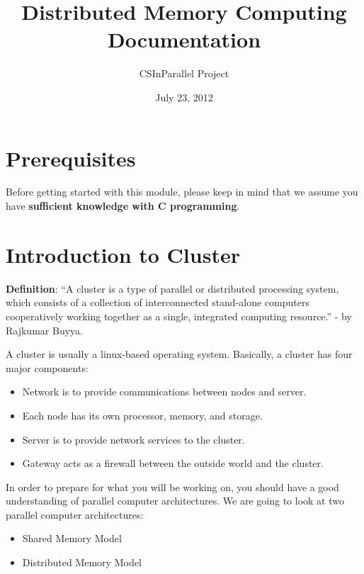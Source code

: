 \documentclass[letterpaper,10pt,openany,oneside]{sphinxmanual}
\title{Distributed Memory Computing Documentation}
\date{July 23, 2012}
\author{CSInParallel Project}
\begin{document}
\maketitle
\tableofcontents
{}\label{index::doc}



\chapter{Prerequisites}
\label{Prerequisites/Prerequisites:prerequisites}\label{Prerequisites/Prerequisites::doc}\label{Prerequisites/Prerequisites:distributed-memory-programming}
Before getting started with this module, please keep in mind that we assume you have \textbf{sufficient knowledge with C programming}.


\chapter{Introduction to Cluster}
\label{IntroCluster/IntroCluster:introduction-to-cluster}\label{IntroCluster/IntroCluster::doc}
\textbf{Definition}: ``A cluster is a type of parallel or distributed processing system, which consists of a collection of interconnected stand-alone computers cooperatively working together as a single, integrated computing resource.'' - by Rajkumar Buyya.

A cluster is usually a linux-based operating system. Basically, a cluster has four major components:
\begin{itemize}
\item {} 
Network is to provide communications between nodes and server.

\item {} 
Each node has its own processor, memory, and storage.

\item {} 
Server is to provide network services to the cluster.

\item {} 
Gateway acts as a firewall between the outside world and the cluster.

\end{itemize}

In order to prepare for what you will be working on, you should have a good understanding of parallel computer architectures. We are going to look at two parallel computer architectures:
\begin{itemize}
\item {} 
Shared Memory Model

\item {} 
Distributed Memory Model

\end{itemize}
\end{document}
